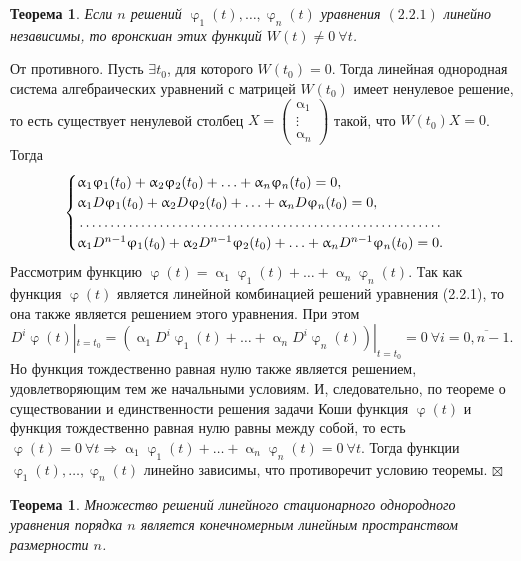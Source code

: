 \documentclass[a4paper, 12pt]{report}
\newenvironment{Proof} %
{\par\noindent{$\blacklozenge$}} %
{\hfill$\scriptstyle\boxtimes$}
\renewcommand{\alpha}{\upalpha}
\renewcommand{\varphi}{\upvarphi}
\begin{document}
	\newtheorem*{2_2_2}{Теорема} \begin{2_2_2} Если $n$ решений $\varphi_1(t), \ldots, \varphi_n(t)$ уравнения $(2.2.1)$ линейно независимы, то вронскиан этих функций $W(t) \ne 0\ \forall t$.
	\end{2_2_2} \begin{Proof}
		От противного. Пусть $\exists t_0$, для которого $W(t_0) = 0$. Тогда линейная однородная система алгебраических уравнений с матрицей $W(t_0)$ имеет ненулевое решение, то есть существует ненулевой столбец $X = \begin{pmatrix}
			\alpha_1 \\ \vdots \\ \alpha_n
		\end{pmatrix}$ такой, что $W(t_0)X = 0$. Тогда $$\begin{cases}
			\alpha_1\varphi_1(t_0) + \alpha_2\varphi_2(t_0) + \ldots + \alpha_n\varphi_n(t_0) = 0,\\
			\alpha_1D\varphi_1(t_0) + \alpha_2D\varphi_2(t_0) + \ldots + \alpha_nD\varphi_n(t_0) = 0,\\
			\dotfill\\
			\alpha_1D^{n-1}\varphi_1(t_0) + \alpha_2D^{n-1}\varphi_2(t_0) + \ldots + \alpha_nD^{n-1}\varphi_n(t_0) = 0.
		\end{cases}$$ Рассмотрим функцию $\varphi(t) = \alpha_1\varphi_1(t) + \ldots + \alpha_n\varphi_n(t)$. Так как функция $\varphi(t)$ является линейной комбинацией решений уравнения (2.2.1), то она также является решением этого уравнения. При этом $$D^i\varphi(t)|_{t=t_0} = (\alpha_1D^i\varphi_1(t) + \ldots + \alpha_nD^i\varphi_n(t))|_{t=t_0} = 0\ \forall i = \overline{0, n-1}.$$
		Но функция тождественно равная нулю также является решением, удовлетворяющим тем же начальными условиям. И, следовательно, по теореме о существовании и единственности решения задачи Коши функция $\varphi(t)$ и функция тождественно равная нулю равны между собой, то есть $\varphi(t) = 0\ \forall t \Rightarrow \alpha_1\varphi_1(t) + \ldots + \alpha_n\varphi_n(t) = 0\ \forall t$. Тогда функции $\varphi_1(t),\ldots,\varphi_n(t)$ линейно зависимы, что противоречит условию теоремы.
	\end{Proof}
	\newtheorem*{2_2_3}{Теорема}\begin{2_2_3}
		Множество решений линейного стационарного однородного уравнения порядка $n$ является конечномерным линейным пространством размерности $n$.
	\end{2_2_3}
\end{document}
